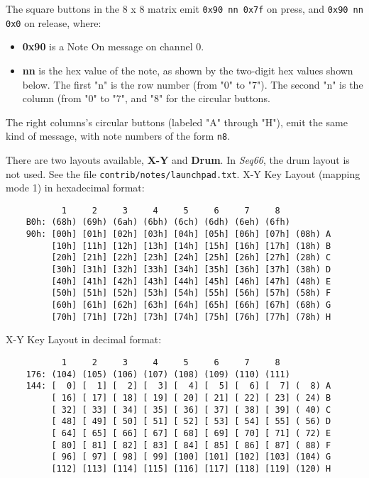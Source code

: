    The square buttons in the 8 x 8 matrix emit
   \texttt{0x90 nn 0x7f} on press, and \texttt{0x90 nn 0x0} on release, where:

   \begin{itemize}
      \item \textbf{0x90}
         is a Note On message on channel 0.
      \item \textbf{nn}
         is the hex value of the note, as shown by the two-digit hex values
            shown below.  The first "n" is the row number (from "0" to "7").
            The second "n" is the column (from "0" to "7", and "8" for the
            circular buttons.
   \end{itemize}

   The right columns's circular buttons (labeled "A" through "H"),
   emit the same kind of message, with note numbers of the form
   \texttt{n8}.

   There are two layouts available, \textbf{X-Y} and \textbf{Drum}.
   In \textsl{Seq66}, the drum layout is not used.
   See the file \texttt{contrib/notes/launchpad.txt}.
   X-Y Key Layout (mapping mode 1) in hexadecimal format:

   \begin{verbatim}
           1     2     3     4     5     6     7     8 
    B0h: (68h) (69h) (6ah) (6bh) (6ch) (6dh) (6eh) (6fh)
    90h: [00h] [01h] [02h] [03h] [04h] [05h] [06h] [07h] (08h) A
         [10h] [11h] [12h] [13h] [14h] [15h] [16h] [17h] (18h) B
         [20h] [21h] [22h] [23h] [24h] [25h] [26h] [27h] (28h) C
         [30h] [31h] [32h] [33h] [34h] [35h] [36h] [37h] (38h) D
         [40h] [41h] [42h] [43h] [44h] [45h] [46h] [47h] (48h) E
         [50h] [51h] [52h] [53h] [54h] [55h] [56h] [57h] (58h) F
         [60h] [61h] [62h] [63h] [64h] [65h] [66h] [67h] (68h) G
         [70h] [71h] [72h] [73h] [74h] [75h] [76h] [77h] (78h) H
   \end{verbatim}

   X-Y Key Layout in decimal format:

   \begin{verbatim}
           1     2     3     4     5     6     7     8 
    176: (104) (105) (106) (107) (108) (109) (110) (111)
    144: [  0] [  1] [  2] [  3] [  4] [  5] [  6] [  7] (  8) A
         [ 16] [ 17] [ 18] [ 19] [ 20] [ 21] [ 22] [ 23] ( 24) B
         [ 32] [ 33] [ 34] [ 35] [ 36] [ 37] [ 38] [ 39] ( 40) C
         [ 48] [ 49] [ 50] [ 51] [ 52] [ 53] [ 54] [ 55] ( 56) D
         [ 64] [ 65] [ 66] [ 67] [ 68] [ 69] [ 70] [ 71] ( 72) E
         [ 80] [ 81] [ 82] [ 83] [ 84] [ 85] [ 86] [ 87] ( 88) F
         [ 96] [ 97] [ 98] [ 99] [100] [101] [102] [103] (104) G
         [112] [113] [114] [115] [116] [117] [118] [119] (120) H
   \end{verbatim}

